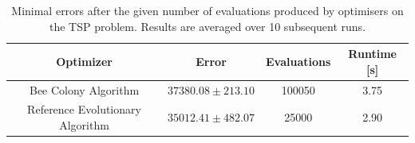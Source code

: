 \begin{table}[H]
	\centering
	\begin{tabular}{|c c c c|}
		\hline
		\textbf{Optimizer} & \textbf{Error} & \textbf{Evaluations} & \textbf{Runtime [s]} \\
		\hline
		Bee Colony Algorithm & $37380.08 \pm 213.10$ & 100050 & 3.75 \\
		Reference Evolutionary Algorithm & $35012.41 \pm 482.07$ & 25000 & 2.90 \\
		\hline
	\end{tabular}
	\caption{Minimal errors after the given number of evaluations produced by optimisers on the TSP problem. Results are averaged over 10 subsequent runs.}
	\label{tab:bee_vs_ea}
\end{table}
